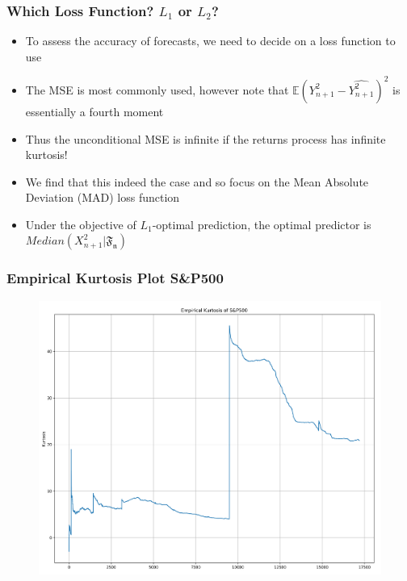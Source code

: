 \documentclass{beamer}
\begin{document}
\begin{frame}
\frametitle{Which Loss Function? $L_1$ or $L_2$?}
\begin{itemize}
\item{To assess the accuracy of forecasts, we need to decide on a loss function to use}
\vspace{3pt}
\item{The MSE is most commonly used, however note that $\mathbb{E}(Y_{n+1}^{2}-\widehat{Y_{n+1}^2})^2$ is essentially a fourth moment}
\vspace{3pt}
\item{Thus the unconditional MSE is infinite if the returns process has infinite kurtosis!}
\vspace{3pt}
\item{We find that this indeed the case and so focus on the Mean Absolute Deviation (MAD) loss function}
\vspace{3pt}
\item{Under the objective of $L_1$-optimal prediction, the optimal predictor is $Median(X_{n+1}^2|\mathfrak{F_n})$}
\end{itemize}
\end{frame}

\begin{frame}
\frametitle{Empirical Kurtosis Plot S&P500}
\begin{figure}[h!]
\includegraphics[width=\textwidth]{sp500_returns_kurtosis.png}
\end{figure}
\end{frame}
\end{document}
